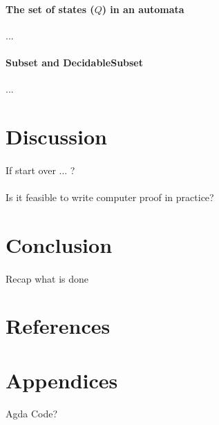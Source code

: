 \documentclass[twoside,openright,final]{bhamthesis}
\begin{document}
\paragraph{The set of states (\(Q\)) in an automata} ...

\paragraph{Subset and DecidableSubset} ...

\newpage
\section{Discussion}
\paragraph{} If start over ... ?

\paragraph{} Is it feasible to write computer proof in practice?

\newpage
\section{Conclusion}
\paragraph{} Recap what is done

\newpage
\section*{References}



\newpage
\section*{Appendices}
\paragraph{} Agda Code?
\end{document}
